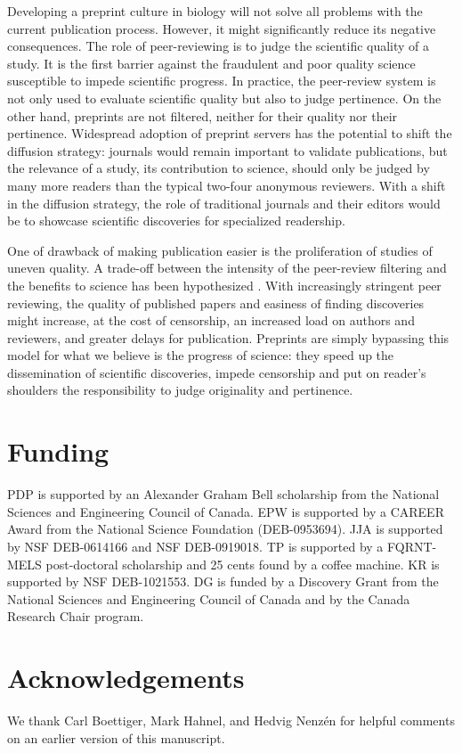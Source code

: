 \documentclass[letterpaper,twocolumn,superscriptaddress,showkeys,longbibliography]{revtex4-1}
\begin{document}
Developing a preprint culture in biology will not solve all problems with the
current publication process. However, it might significantly reduce its negative
consequences. The role of peer-reviewing is to judge the scientific quality of a
study. It is the first barrier against the fraudulent and poor quality science
susceptible to impede scientific progress. In practice, the peer-review system
is not only used to evaluate scientific quality but also to judge pertinence. On
the other hand, preprints are not filtered, neither for their quality nor their
pertinence. Widespread adoption of preprint servers has the potential to shift
the diffusion strategy: journals would remain important to validate
publications, but the relevance of a study, its contribution to science, should
only be judged by many more readers than the typical two-four anonymous
reviewers. With a shift in the diffusion strategy, the role of traditional
journals and their editors would be to showcase scientific discoveries for
specialized readership. 

One of drawback of making publication easier is the proliferation of studies of
uneven quality. A trade-off between the intensity of the peer-review filtering
and the benefits to science has been hypothesized \cite{Aarssen2012}.  With
increasingly stringent peer reviewing, the quality of published papers and
easiness of finding discoveries might increase, at the cost of censorship, an
increased load on authors and reviewers, and greater delays for publication.
Preprints are simply bypassing this model for what we believe is the progress of
science: they speed up the dissemination of scientific discoveries, impede
censorship and put on reader's shoulders the responsibility to judge originality
and pertinence.

\section{Funding}

PDP is supported by an Alexander Graham Bell scholarship from the National
Sciences and Engineering Council of Canada. EPW is supported by a CAREER Award
from the National Science Foundation (DEB-0953694). JJA is supported by NSF
DEB-0614166 and NSF DEB-0919018.  TP is supported by a FQRNT-MELS post-doctoral
scholarship and 25 cents found by a coffee machine.  KR is supported by NSF
DEB-1021553. DG is funded by a Discovery Grant from the National Sciences and
Engineering Council of Canada and by the Canada Research Chair program.

\section{Acknowledgements}

We thank Carl Boettiger, Mark Hahnel, and Hedvig Nenz\'en for helpful comments
on an earlier version of this manuscript.

\newpage

\end{document}
